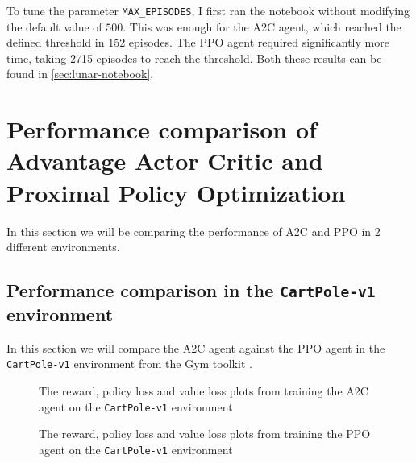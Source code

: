 \documentclass{article}
\begin{document}
  To tune the parameter \texttt{MAX\_EPISODES}, I first ran the notebook
  without modifying the default value of $500$.  This was enough for the A2C
  agent, which reached the defined threshold in 152 episodes.  The PPO agent
  required significantly more time, taking 2715 episodes to reach the threshold.
  Both these results can be found in \autoref{sec:lunar-notebook}.

 \section[Performance comparison of A2C and PPO]{Performance comparison of 
   Advantage Actor Critic and Proximal Policy Optimization}
  In this section we will be comparing the performance of A2C and PPO in 2
  different environments.

  \subsection{Performance comparison in the \texttt{CartPole-v1} environment}
  \label{subsec:performance-cartpole}
   In this section we will compare the A2C agent against the PPO agent in the
   \texttt{CartPole-v1} environment from the Gym toolkit \cite{gym}.

   \begin{figure}[htbp]
    \centering
    \caption{The reward, policy loss and value loss plots from training the A2C
             agent on the \texttt{CartPole-v1} environment}
    \label{fig:cartpole-a2c-train}
   \end{figure}

   \begin{figure}[htbp]
    \centering
    \caption{The reward, policy loss and value loss plots from training the PPO
             agent on the \texttt{CartPole-v1} environment}
    \label{fig:cartpole-ppo-train}
   \end{figure}
\end{document}
